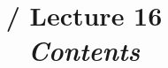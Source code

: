 \renewcommand{\prevlecture}{15 }
\renewcommand{\thislecture}{16 }
\renewcommand{\nextlecture}{0 }

%
%

\title[\modulename / Lecture \thislecture]
{
  \modulename / Lecture \thislecture \\
  {\it Contents}\\
}



\begin{frame}[plain]
  \titlepage
\end{frame}


